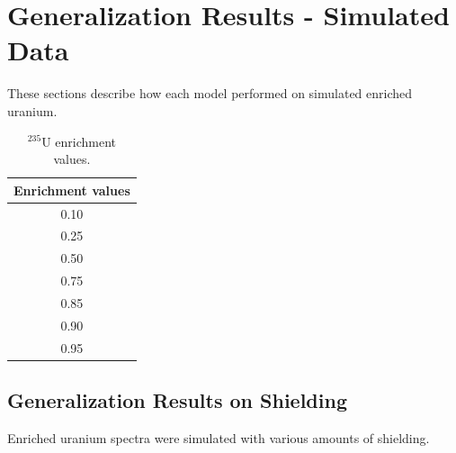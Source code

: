 \section{Generalization Results - Simulated Data}

These sections describe how each model performed on simulated enriched uranium.


\begin{table}[H]
\centering
\label{table:generalization_enrichment_values}
\caption{$^{235}$U enrichment values.}
\begin{tabular}{c}

Enrichment values \\ \hline
0.10 \\ \hline
0.25 \\ \hline
0.50 \\ \hline
0.75 \\ \hline
0.85 \\ \hline
0.90 \\ \hline
0.95 \\ \hline
\end{tabular}
\end{table}


\subsection{Generalization Results on Shielding}

Enriched uranium spectra were simulated with various amounts of shielding.



